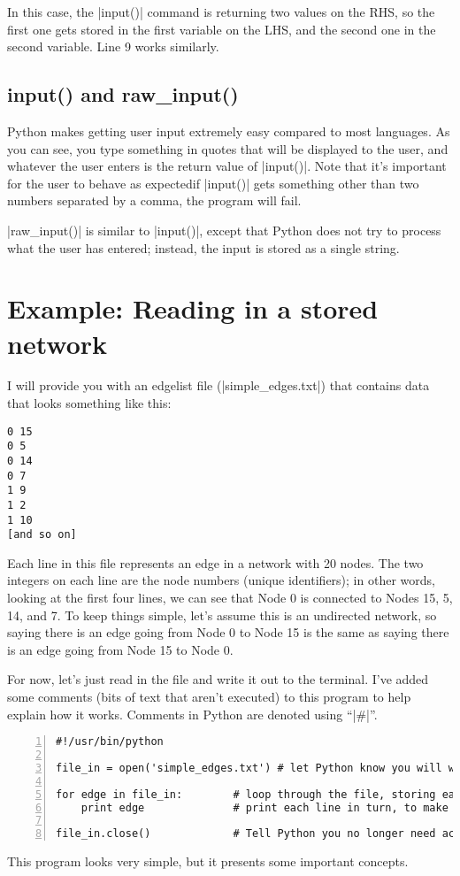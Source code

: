 \documentclass{article}
\begin{document}
In this case, the |input()| command is returning two values on the RHS, so the
first one gets stored in the first variable on the LHS, and the second one in
the second variable.  Line 9 works similarly.

\subsection{input() and raw\_input()}
Python makes getting user input extremely easy compared to most languages.  As
you can see, you type something in quotes that will be displayed to the user,
and whatever the user enters is the return value of |input()|.  Note that it's
important for the user to behave as expected\textemdash if |input()| gets
something other than two numbers separated by a comma, the program will fail.

|raw_input()| is similar to |input()|, except that Python does not try to process what
the user has entered; instead, the input is stored as a single string.

\section{Example: Reading in a stored network}
\label{stored_net}
I will provide you with an edgelist file (|simple_edges.txt|) that contains data that looks something
like this:

\begin{Verbatim}
0 15                          
0 5                           
0 14                          
0 7                           
1 9                           
1 2                           
1 10                          
[and so on]
\end{Verbatim}

Each line in this file represents an edge in a network with 20 nodes.  The two integers on
each line are the node numbers (unique identifiers); in other words, looking at the first four lines, we can see that Node 0 is
connected to Nodes 15, 5, 14, and 7.  To keep things simple, let's assume this is an
undirected network, so saying there is an edge going from Node 0 to Node 15 is
the same as saying there is an edge going from Node 15 to Node 0.

For now, let's just read in the file and write it out to the terminal.  I've added some comments (bits of text that
aren't executed) to this program to help explain how it works. Comments in Python are denoted using ``|#|''.

\begin{Verbatim}[numbers=left, samepage=true]
#!/usr/bin/python

file_in = open('simple_edges.txt') # let Python know you will want to access the file

for edge in file_in:        # loop through the file, storing each line in turn in 'edge'
    print edge              # print each line in turn, to make sure everything's working

file_in.close()             # Tell Python you no longer need access
\end{Verbatim}
This program looks very simple, but it presents some important concepts.
\end{document}
